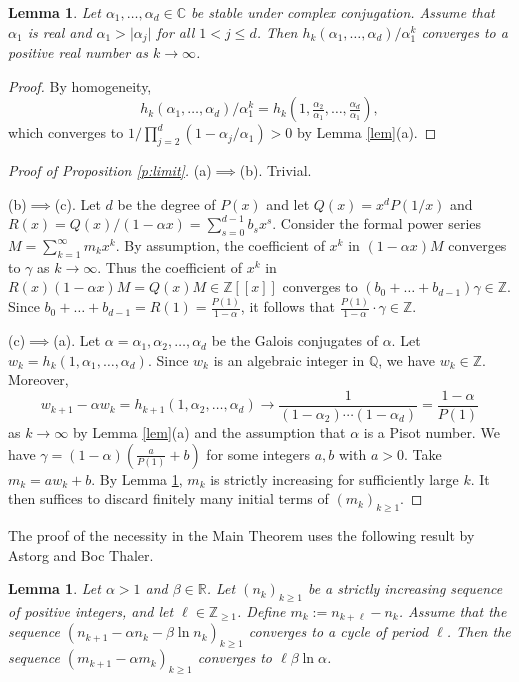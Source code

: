 \documentclass[12pt,centertags,oneside]{amsart}
\newtheorem{lemma}[theorem]{Lemma}
\theoremstyle{definition}
\newcommand{\Q}{\mathbb{Q}}
\newcommand{\CC}{\mathbb{C}}
\newcommand{\R}{\mathbb{R}}
\newcommand{\Z}{\mathbb{Z}}
\renewcommand{\ge}{\geqslant}
\begin{document}
\begin{lemma}\label{lem2}
Let $\alpha_1,\dots,\alpha_d\in \CC$ be stable under complex conjugation. 
Assume that $\alpha_1$ is real and $\alpha_1 
>\lvert \alpha_j\rvert$  for all $1< j\leqslant d$. Then 
$h_k(\alpha_1,\dots,\alpha_d)/\alpha_1^k$ converges to a positive real number 
as $k\to \infty$. 
\end{lemma}

\begin{proof}
By homogeneity, 
\[
h_k(\alpha_1,\dots,\alpha_d)/\alpha_1^k=h_k(1,\tfrac{\alpha_2}{\alpha_1},\dots,\tfrac{\alpha_d}{\alpha_1}),
\]
which converges to $1/\prod\limits_{j=2}^d (1-\alpha_j/\alpha_1)>0$ by Lemma 
\ref{lem}(a). 
\end{proof}

\begin{proof}[Proof of Proposition \ref{p:limit}]
(a)$\implies$(b). Trivial.

(b)$\implies$(c). Let $d$ be the degree of $P(x)$ and let $Q(x)=x^dP(1/x)$ 
and $R(x)=Q(x)/(1-\alpha x)=\sum_{s=0}^{d-1} b_s x^s$. Consider the formal 
power series $M=\sum_{k=1}^\infty m_k x^k$. By assumption, the coefficient 
of $x^k$ in $(1-\alpha x)M$ converges to $\gamma$ as $k\to \infty$. Thus 
the coefficient of $x^k$ in $R(x)(1-\alpha x)M=Q(x)M\in \Z[[x]]$ converges 
to $(b_0+\dots+b_{d-1})\gamma\in \Z$. Since 
$b_0+\dots+b_{d-1}=R(1)=\frac{P(1)}{1-\alpha}$, it follows that 
$\frac{P(1)}{1-\alpha}\cdot \gamma\in \Z$. 

(c)$\implies$(a). Let $\alpha=\alpha_1,\alpha_2,\dots,\alpha_d$ be the 
Galois conjugates of $\alpha$. Let $w_k=h_k(1,\alpha_1,\dots,\alpha_d)$. 
Since $w_k$ is an algebraic integer in $\Q$, we have $w_k\in \Z$. Moreover,
\[w_{k+1}-\alpha w_k=h_{k+1}(1,\alpha_2,\dots,\alpha_d)\to \frac{1}{(1-\alpha_2)\dotsm (1-\alpha_d)}=\frac{1-\alpha}{P(1)}\]
as $k\to \infty$ by Lemma \ref{lem}(a) and the assumption that $\alpha$ is 
a Pisot number. We have $\gamma=(1-\alpha)(\frac{a}{P(1)}+b)$ for some 
integers $a,b$ with $a>0$. Take $m_k=aw_k+b$. By Lemma \ref{lem2}, $m_k$ is 
strictly increasing for sufficiently large $k$. It then suffices to discard 
finitely many initial terms of $(m_k)_{k\ge 1}$. 
\end{proof}

The proof of the necessity in the Main Theorem uses the following result by 
Astorg and Boc Thaler. 

\begin{lemma}\label{l:cycle}\cite[Lemma~10.4]{Astorg-Boc Thaler-2024}
Let $\alpha>1$ and $\beta\in \R$. Let $(n_k)_{k\geqslant 1}$ be a strictly 
increasing sequence of positive integers, and let 
$\ell\in\mathbb{Z}_{\geqslant 1}$. Define $m_k:=n_{k+\ell}-n_k$. Assume 
that the sequence $(n_{k+1}-\alpha n_k-\beta\ln n_k)_{k\geqslant 1}$ 
converges to a cycle of period $\ell$. Then the sequence $(m_{k+1}-\alpha 
m_k)_{k\geqslant 1}$ converges to $\ell \beta \ln \alpha$. 
\end{lemma}
\end{document}

